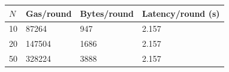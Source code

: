 \begin{tabular}{llll}
\toprule
$N$ & Gas/round & Bytes/round & Latency/round (s) \\
\midrule
10 & 87264 & 947 & 2.157 \\
20 & 147504 & 1686 & 2.157 \\
50 & 328224 & 3888 & 2.157 \\
\bottomrule
\end{tabular}
